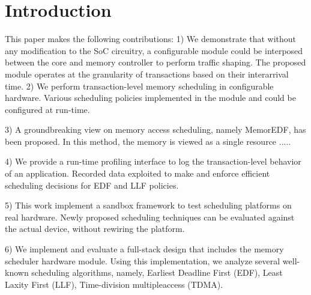 \section{Introduction}


This paper makes the following contributions:
1) We demonstrate that without any modification to the SoC circuitry, a configurable module could be interposed between the core and memory controller to perform traffic shaping. The proposed module operates at the granularity of transactions based on their interarrival time.
2) We perform transaction-level memory scheduling in configurable hardware. Various scheduling policies implemented in the module and could be configured at run-time.

3) A groundbreaking view on memory access scheduling, namely MemorEDF, has been proposed. In this method, the memory is viewed as a single resource .....

4) We provide a run-time profiling interface to log the transaction-level behavior of an application. Recorded data exploited to make and enforce efficient scheduling decisions for EDF and LLF policies.

5) This work implement a sandbox framework to test scheduling platforms on real hardware. Newly proposed scheduling techniques can be evaluated against the actual device, without rewiring the platform.

6) We implement and evaluate a full-stack design that includes the memory scheduler hardware module. Using this implementation, we analyze several well-known scheduling algorithms, namely, Earliest Deadline First (EDF), Least Laxity First (LLF), Time-division multipleaccess (TDMA).

